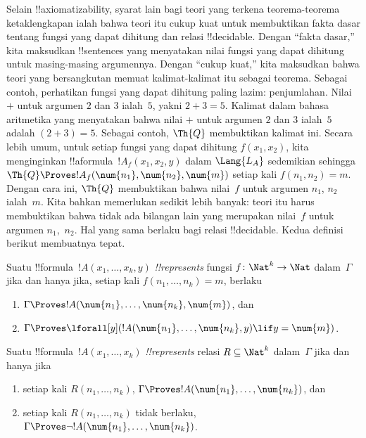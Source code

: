 \documentclass[../../../include/open-logic-section]{subfiles}
\begin{document}
Selain !!{axiomatizability}, syarat lain bagi teori yang terkena
teorema-teorema ketaklengkapan ialah bahwa teori itu cukup kuat untuk
membuktikan fakta dasar tentang fungsi yang dapat dihitung dan relasi
!!{decidable}. Dengan ``fakta dasar,'' kita maksudkan !!{sentence}s yang
menyatakan nilai fungsi yang dapat dihitung untuk masing-masing argumennya.
Dengan ``cukup kuat,'' kita maksudkan bahwa teori yang bersangkutan memuat
kalimat-kalimat itu sebagai teorema. Sebagai contoh, perhatikan fungsi yang
dapat dihitung paling lazim: penjumlahan. Nilai $+$ untuk argumen $2$ dan $3$
ialah~$5$, yakni $2+3 = 5$. Kalimat dalam bahasa aritmetika yang menyatakan
bahwa nilai $+$ untuk argumen $2$ dan $3$ ialah~$5$ adalah
$(\num{2} + \num{3}) = \num{5}$. Sebagai contoh, $\Th{Q}$ membuktikan kalimat
ini. Secara lebih umum, untuk setiap fungsi yang dapat dihitung
$f(x_1, x_2)$, kita menginginkan !!a{formula}~$!A_f(x_1, x_2, y)$ dalam
$\Lang{L_A}$ sedemikian sehingga $\Th{Q} \Proves
!A_f(\num{n_1}, \num{n_2}, \num{m})$ setiap kali $f(n_1, n_2) = m$. Dengan cara
ini, $\Th{Q}$ membuktikan bahwa nilai~$f$ untuk argumen $n_1$, $n_2$ ialah~$m$.
Kita bahkan memerlukan sedikit lebih banyak: teori itu harus membuktikan bahwa
tidak ada bilangan lain yang merupakan nilai~$f$ untuk argumen $n_1$,~$n_2$.
Hal yang sama berlaku bagi relasi !!{decidable}. Kedua definisi berikut
membuatnya tepat.

\begin{defn}
Suatu !!{formula}~$!A(x_1, \dots, x_k, y)$ \emph{!!{represents}} fungsi
$f\colon \Nat^k \to \Nat$ dalam~$\Gamma$ jika dan hanya jika, setiap kali
$f(n_1, \dots, n_k) = m$, berlaku
\begin{enumerate}
\item $\Gamma \Proves !A(\num{n_1}, \dots, \num{n_k}, \num{m})$, dan
\item $\Gamma \Proves \lforall[y](!A(\num{n_1}, \dots, \num{n_k},
y) \lif y = \num{m})$.
\end{enumerate}
\end{defn}

\begin{defn}
Suatu !!{formula}~$!A(x_1, \dots, x_k)$ \emph{!!{represents}} relasi
$R \subseteq \Nat^k$ dalam~$\Gamma$ jika dan hanya jika
\begin{enumerate}
\item setiap kali $R(n_1, \dots, n_k)$, $\Gamma \Proves
  !A(\num{n_1}, \dots, \num{n_k})$, dan
\item setiap kali $R(n_1, \dots, n_k)$ tidak berlaku, $\Gamma \Proves \lnot
  !A(\num{n_1}, \dots, \num{n_k})$.
\end{enumerate}
\end{defn}
\end{document}
